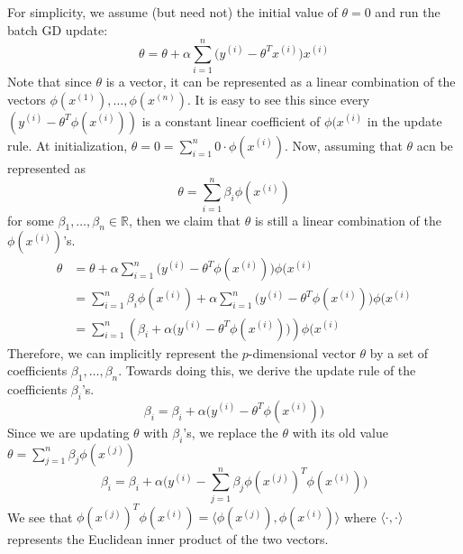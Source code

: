 \documentclass[a4paper, 12pt]{report}
\theoremstyle{remark}
\theoremstyle{definition}
\begin{document}
For simplicity, we assume (but need not) the initial value of $\theta = 0$ and run the batch GD update: 
\[\theta = \theta + \alpha \sum_{i=1}^n \big( y^{(i)} - \theta^T x^{(i)} \big) x^{(i)}\]
Note that since $\theta$ is a vector, it can be represented as a linear combination of the vectors $\phi(x^{(1)}), \ldots, \phi(x^{(n)})$. It is easy to see this since every $(y^{(i)} - \theta^T \phi(x^{(i)}))$ is a constant linear coefficient of $\phi(x^{(i)}$ in the update rule. At initialization, $\theta = 0 = \sum_{i=1}^n 0 \cdot \phi(x^{(i)})$. Now, assuming that $\theta$ acn be represented as 
\[\theta = \sum_{i=1}^n \beta_i \phi(x^{(i)})\]
for some $\beta_1, \ldots, \beta_n \in \mathbb{R}$, then we claim that $\theta$ is still a linear combination of the $\phi(x^{(i)})$'s. 
\begin{align*}
    \theta & = \theta + \alpha \sum_{i=1}^n \big( y^{(i)} - \theta^T \phi(x^{(i)}) \big) \phi(x^{(i)} \\
    & = \sum_{i=1}^n \beta_i \phi(x^{(i)}) + \alpha \sum_{i=1}^n \big( y^{(i)} - \theta^T \phi(x^{(i)})\big) \phi(x^{(i)} \\
    & = \sum_{i=1}^n (\beta_i + \alpha\big( y^{(i)} - \theta^T \phi(x^{(i)})\big) ) \phi(x^{(i)} 
\end{align*}
Therefore, we can implicitly represent the $p$-dimensional vector $\theta$ by a set of coefficients $\beta_1, \ldots, \beta_n$. Towards doing this, we derive the update rule of the coefficients $\beta_i$'s. 
\[\beta_i = \beta_i + \alpha \big( y^{(i)} - \theta^T \phi(x^{(i)})\big) \]
Since we are updating $\theta$ with $\beta_i$'s, we replace the $\theta$ with its old value $\theta = \sum_{j=1}^n \beta_j \phi(x^{(j)})$
\[\beta_i = \beta_i + \alpha \Bigg( y^{(i)} - \sum_{j=1}^n \beta_j \phi(x^{(j)})^T \phi(x^{(i)})\Bigg)\]
We see that $\phi(x^{(j)})^T \phi(x^{(i)}) = \langle \phi(x^{(j)}), \phi(x^{(i)}) \rangle$ where $\langle \cdot, \cdot \rangle$ represents the Euclidean inner product of the two vectors. 
\end{document}
